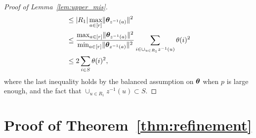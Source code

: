 \documentclass[lettersize,onecolumn,journal]{IEEEtran}
\theoremstyle{definition}
\theoremstyle{definition}
\begin{document}
\begin{proof}[Proof of Lemma~\ref{lem:upper_mis}]
\begin{align}
    & \leq |R_1| \max_{a \in [r]} \lVert\boldsymbol{\theta}_{z^{-1}(a)}\rVert^2  \\
    & \leq {\max_{a \in [r]} \lVert\boldsymbol{\theta}_{z^{-1}(a)}\rVert^2 \over \min_{a \in [r]} \lVert\boldsymbol{\theta}_{z^{-1}(a)}\rVert^2 } \sum_{i \in \cup_{u \in R_1} z^{-1}(u)} \theta(i)^2\\
    & \leq 2 \sum_{i \in S} \theta(i)^2,
\end{align}
where the last inequality holds by the balanced assumption on $\boldsymbol{\theta}$ when $p$ is large enough, and the fact that $ \cup_{u \in R_1} z^{-1}(u) \subset S$.
\end{proof}

\section*{Proof of Theorem~\ref{thm:refinement}}
\end{document}
